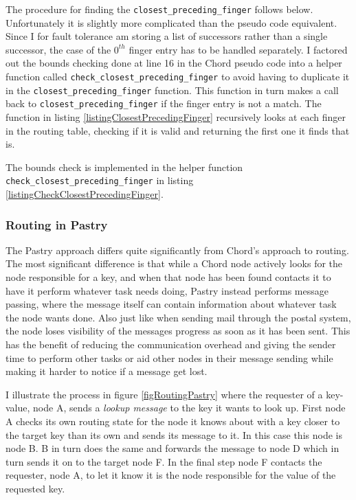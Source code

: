 The procedure for finding the \verb=closest_preceding_finger= follows below. Unfortunately it is slightly more complicated than the pseudo code equivalent. Since I for fault tolerance am storing a list of successors rather than a single successor, the case of the $ 0^{th} $ finger entry has to be handled separately. 
I factored out the bounds checking done at line 16 in the Chord pseudo code into a helper function called \verb=check_closest_preceding_finger= to avoid having to duplicate it in the \verb=closest_preceding_finger= function.
This function in turn makes a call back to \verb=closest_preceding_finger= if the finger entry is not a match.
The function in listing \ref{listingClosestPrecedingFinger} recursively looks at each finger in the routing table, checking if it is valid and returning the first one it finds that is.



The bounds check is implemented in the helper function \verb=check_closest_preceding_finger= in listing \ref{listingCheckClosestPrecedingFinger}.



\subsubsection{Routing in Pastry}
\label{sec:routingInPastry}
The Pastry approach differs quite significantly from Chord's approach to routing.
The most significant difference is that while a Chord node actively looks for the node responsible for a key, and when that node has been found contacts it to have it perform whatever task needs doing, Pastry instead performs message passing, where the message itself can contain information about whatever task the node wants done.
Also just like when sending mail through the postal system, the node loses visibility of the messages progress as soon as it has been sent. This has the benefit of reducing the communication overhead and giving the sender time to perform other tasks or aid other nodes in their message sending while making it harder to notice if a message get lost.

I illustrate the process in figure \ref{figRoutingPastry} where the requester of a key-value, node A, sends a \emph{lookup message} to the key it wants to look up. First node A checks its own routing state for the node it knows about with a key closer to the target key than its own and sends its message to it. In this case this node is node B. B in turn does the same and forwards the message to node D which in turn sends it on to the target node F. In the final step node F contacts the requester, node A, to let it know it is the node responsible for the value of the requested key. 

